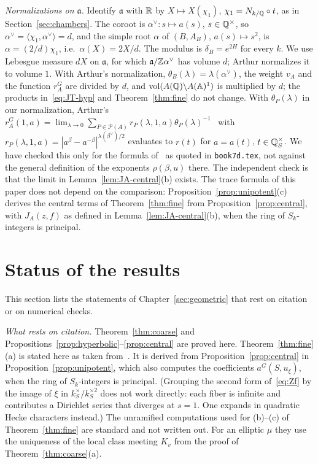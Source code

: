 \begin{remarkrev}\label{rem:alpha}
\emph{Normalizations on $\mathfrak a$.} Identify $\mathfrak a$ with $\mathbb{R}$ by
$X\mapsto X(\chi_1)$, $\chi_1=N_{k/\mathbb{Q}}\circ t$, as in
Section~\ref{sec:chambers}. The coroot is $\alpha^\vee\colon s\mapsto
a(s)$, $s\in\mathbb{Q}^\times$, so $\alpha^\vee=\langle\chi_1,\alpha^\vee\rangle=
d$, and the simple root $\alpha$ of $(B,A_B)$, $a(s)\mapsto s^2$, is
$\alpha=(2/d)\chi_1$, i.e.\ $\alpha(X)=2X/d$. The modulus is $\delta_B=e^{2H}$ for every $k$. We use
Lebesgue measure $dX$ on $\mathfrak a$, for which $\mathfrak
a/\mathbb{Z}\alpha^\vee$ has volume $d$; Arthur normalizes it to volume $1$. With
Arthur's normalization, $\theta_B(\lambda)=\lambda(\alpha^\vee)$, the
weight $v_A$ and the function $r_A^G$ are divided by $d$, and
$\operatorname{vol}(A(\mathbb{Q})\backslash A(\mathbb{A})^1)$ is multiplied by $d$; the products
in~\eqref{eq:JT-hyp} and Theorem~\ref{thm:fine} do not change. With
$\theta_P(\lambda)$ in our normalization, Arthur's
$r^G_A(1,a)=\lim_{\lambda\to0}\sum_{P\in\mathcal P(A)}r_P(\lambda,1,a)
\theta_P(\lambda)^{-1}$~\cite[\S3]{Ar88a} with $r_P(\lambda,1,a)=
|a^\beta-a^{-\beta}|^{\lambda(\beta^\vee)/2}$ evaluates to $r(t)$ for
$a=a(t)$, $t\in\mathbb{Q}_S^\times$. We have checked this only for the formula
of~\cite{Ar88a} as quoted in \texttt{book7d.tex}, not against the general
definition of the exponents $\rho(\beta,u)$ there. The independent check is
that the limit in Lemma~\ref{lem:JA-central}(b) exists. The trace formula
of this paper does not depend on the comparison:
Proposition~\ref{prop:unipotent}(c) derives the central terms of
Theorem~\ref{thm:fine} from Proposition~\ref{prop:central}, with
$J_A(z,f)$ as defined in Lemma~\ref{lem:JA-central}(b), when the ring of
$S_k$-integers is principal.
\end{remarkrev}

\section{Status of the results}\label{sec:status4}

This section lists the statements of Chapter~\ref{sec:geometric}
that rest on citation or on numerical checks.


\begin{remarkrev}\label{rem:sec4-status}
\emph{What rests on citation.} Theorem~\ref{thm:coarse} and
Propositions~\ref{prop:hyperbolic}--\ref{prop:central} are proved here.
Theorem~\ref{thm:fine}(a) is stated here as taken from~\cite{Ar86,Li14a}.
It is derived from Proposition~\ref{prop:central} in
Proposition~\ref{prop:unipotent}, which also computes the coefficients
$a^G(S,u_\xi)$, when the ring of $S_k$-integers is principal. (Grouping
the second form of~\eqref{eq:Zf} by the image of $\xi$ in
$k_S^\times/k_S^{\times2}$ does not work directly: each fiber is infinite
and contributes a Dirichlet series that diverges at $s=1$. One expands in
quadratic Hecke characters instead.) The unramified computations used for (b)--(c) of
Theorem~\ref{thm:fine} are standard and not written out. For an
elliptic $\mu$ they use the uniqueness of the local class meeting $K_v$
from the proof of Theorem~\ref{thm:coarse}(a).
\end{remarkrev}

